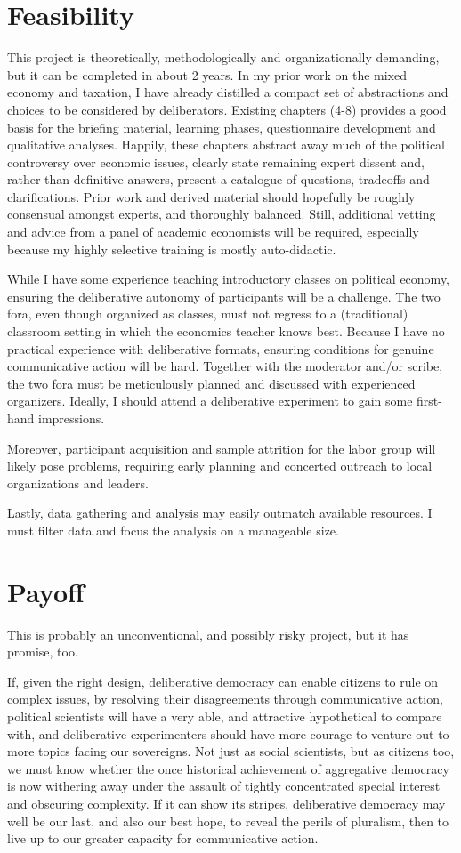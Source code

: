 \section{Feasibility}
This project is theoretically, methodologically and organizationally demanding, but it can be completed in about 2 years.
In my prior work on the mixed economy and taxation, I have already distilled a compact set of abstractions and choices to be considered by deliberators.
Existing chapters (4-8) provides a good basis for the briefing material, learning phases, questionnaire development and qualitative analyses.
Happily, these chapters abstract away much of the political controversy over economic issues, clearly state remaining expert dissent and, rather than definitive answers, present a catalogue of questions, tradeoffs and clarifications.
Prior work and derived material should hopefully be roughly consensual amongst experts, and thoroughly balanced.
Still, additional vetting and advice from a panel of academic economists will be required, especially because my highly selective training is mostly auto-didactic.

While I have some experience teaching introductory classes on political economy, ensuring the deliberative autonomy of participants will be a challenge.
The two fora, even though organized as classes, must not regress to a (traditional) classroom setting in which the economics teacher knows best.
Because I have no practical experience with deliberative formats, ensuring conditions for genuine communicative action will be hard.
Together with the moderator and/or scribe, the two fora must be meticulously planned and discussed with experienced organizers.
Ideally, I should attend a deliberative experiment to gain some first-hand impressions.

Moreover, participant acquisition and sample attrition for the labor group will likely pose problems, requiring early planning and concerted outreach to local organizations and leaders.

Lastly, data gathering and analysis may easily outmatch available resources.
I must filter data and focus the analysis on a manageable size.

\section{Payoff}
This is probably an unconventional, and possibly risky project, but it has promise, too.

If, given the right design, deliberative democracy can enable citizens to rule on complex issues, by resolving their disagreements through communicative action, political scientists will have a very able, and attractive hypothetical to compare with, and deliberative experimenters should have more courage to venture out to more topics facing our sovereigns.
Not just as social scientists, but as citizens too, we must know whether the once historical achievement of aggregative democracy is now withering away under the assault of tightly concentrated special interest and obscuring complexity.
If it can show its stripes, deliberative democracy may well be our last, and also our best hope, to reveal the perils of pluralism, then to live up to our greater capacity for communicative action.


